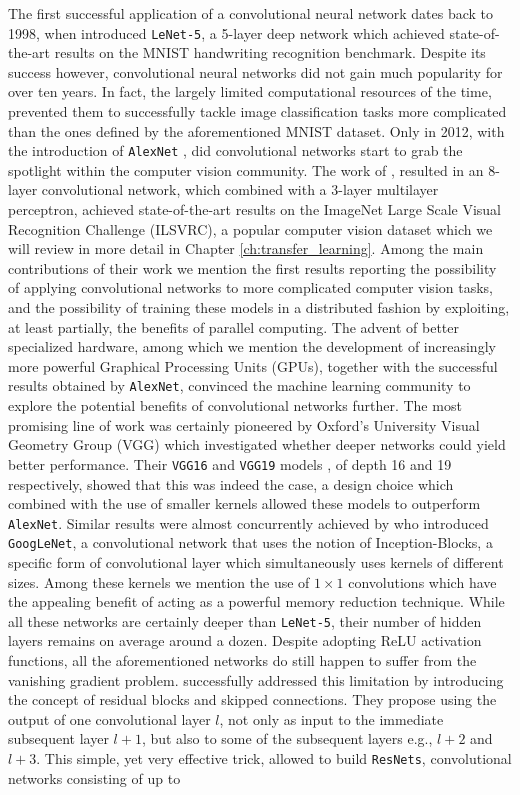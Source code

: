 The first successful application of a convolutional neural network dates back to 1998, when \citet{lecun1998gradient} introduced \texttt{LeNet-5}, a 5-layer deep network which achieved state-of-the-art results on the MNIST handwriting recognition benchmark. Despite its success however, convolutional neural networks did not gain much popularity for over ten years. In fact, the largely limited computational resources of the time, prevented them to successfully tackle image classification tasks more complicated than the ones defined by the aforementioned MNIST dataset. Only in 2012, with the introduction of \texttt{AlexNet} \cite{krizhevsky2012imagenet}, did convolutional networks start to grab the spotlight within the computer vision community.  The work of \citet{krizhevsky2012imagenet}, resulted in an 8-layer convolutional network, which combined with a 3-layer multilayer perceptron, achieved state-of-the-art results on the ImageNet Large Scale Visual Recognition Challenge (ILSVRC), a popular computer vision dataset which we will review in more detail in Chapter \ref{ch:transfer_learning}. Among the main contributions of their work we mention the first results reporting the possibility of applying convolutional networks to more complicated computer vision tasks, and the possibility of training these models in a distributed fashion by exploiting, at least partially, the benefits of parallel computing. The advent of better specialized hardware, among which we mention the development of increasingly more powerful Graphical Processing Units (GPUs), together with the successful results obtained by \texttt{AlexNet}, convinced the machine learning community to explore the potential benefits of convolutional networks further. The most promising line of work was certainly pioneered by Oxford's University Visual Geometry Group (VGG) which investigated whether deeper networks could yield better performance. Their \texttt{VGG16} and \texttt{VGG19} models \cite{simonyan2014very}, of depth 16 and 19 respectively, showed that this was indeed the case, a design choice which combined with the use of smaller kernels allowed these models to outperform \texttt{AlexNet}. Similar results were almost concurrently achieved by \citet{szegedy2015going} who introduced \texttt{GoogLeNet}, a convolutional network that uses the notion of Inception-Blocks, a specific form of convolutional layer which simultaneously uses kernels of different sizes. Among these kernels we mention the use of $1\times1$ convolutions which have the appealing benefit of acting as a powerful memory reduction technique. While all these networks are certainly deeper than \texttt{LeNet-5}, their number of hidden layers remains on average around a dozen. Despite adopting ReLU activation functions, all the aforementioned networks do still happen to suffer from the vanishing gradient problem. \citet{he2016deep} successfully addressed this limitation by introducing the concept of residual blocks and skipped connections. They propose using the output of one convolutional layer $l$, not only as input to the immediate subsequent layer $l+1$, but also to some of the subsequent layers e.g., $l+2$ and $l+3$. This simple, yet very effective trick, allowed \citet{he2016deep} to build \texttt{ResNets}, convolutional networks consisting of up to 